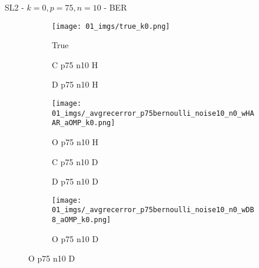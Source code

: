 \begin{frame}{SL2 - $k=0,p=75,n=10$ - BER}{}
\begin{figure}
\begin{subfigure}{0.13\textwidth}
\texttt{[image: 01\_imgs/true\_k0.png]}
\caption*{\tiny True}
\end{subfigure}
\begin{subfigure}{0.13\textwidth}
\caption*{\tiny C p75 n10 H}
\end{subfigure}
\begin{subfigure}{0.13\textwidth}
\caption*{\tiny D p75 n10 H}
\end{subfigure}
\begin{subfigure}{0.13\textwidth}
\texttt{[image: 01\_imgs/\_avgrecerror\_p75bernoulli\_noise10\_n0\_wHAAR\_aOMP\_k0.png]}
\caption*{\tiny O p75 n10 H}
\end{subfigure}
\begin{subfigure}{0.13\textwidth}
\caption*{\tiny C p75 n10 D}
\end{subfigure}
\begin{subfigure}{0.13\textwidth}
\caption*{\tiny D p75 n10 D}
\end{subfigure}
\begin{subfigure}{0.13\textwidth}
\texttt{[image: 01\_imgs/\_avgrecerror\_p75bernoulli\_noise10\_n0\_wDB8\_aOMP\_k0.png]}
\caption*{\tiny O p75 n10 D}
\end{subfigure}

\vspace{5pt}


\end{figure}
\end{frame}
